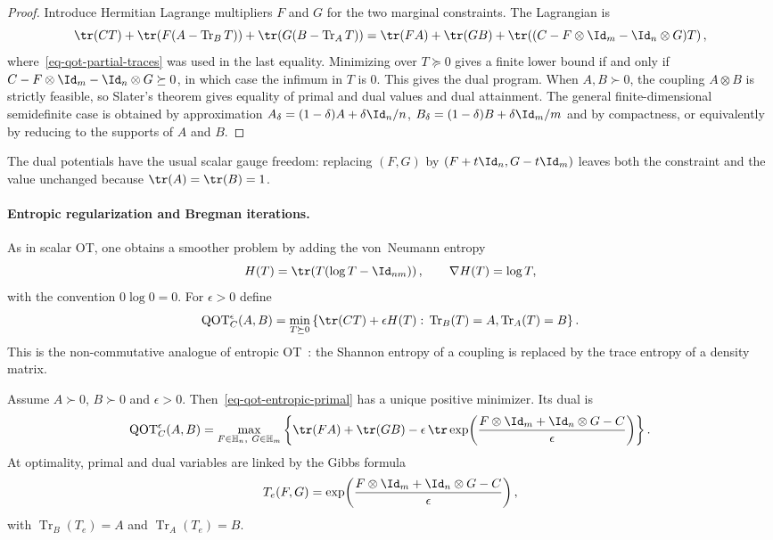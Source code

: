\begin{proof}
	Introduce Hermitian Lagrange multipliers $F$ and $G$ for the two marginal constraints. The Lagrangian is
	\[
		\tr(CT)+\tr\!\left(F(A-\operatorname{Tr}_B T)\right)
		+\tr\!\left(G(B-\operatorname{Tr}_A T)\right)
		=
		\tr(FA)+\tr(GB)
		+\tr\!\left((C-F\otimes\Id_m-\Id_n\otimes G)T\right),
	\]
	where~\eqref{eq-qot-partial-traces} was used in the last equality. Minimizing over $T\succeq0$ gives a finite lower bound if and only if $C-F\otimes\Id_m-\Id_n\otimes G\succeq0$, in which case the infimum in $T$ is $0$. This gives the dual program. When $A,B\succ0$, the coupling $A\otimes B$ is strictly feasible, so Slater's theorem gives equality of primal and dual values and dual attainment. The general finite-dimensional semidefinite case is obtained by approximation $A_\delta=(1-\delta)A+\delta\Id_n/n$, $B_\delta=(1-\delta)B+\delta\Id_m/m$ and by compactness, or equivalently by reducing to the supports of $A$ and $B$.
\end{proof}

The dual potentials have the usual scalar gauge freedom: replacing $(F,G)$ by $(F+t\Id_n,G-t\Id_m)$ leaves both the constraint and the value unchanged because $\tr(A)=\tr(B)=1$.

\paragraph{Entropic regularization and Bregman iterations.}
As in scalar OT, one obtains a smoother problem by adding the von~Neumann entropy
\[
	H(T)=\tr\!\left(T(\log T-\Id_{nm})\right),
	\qquad
	\nabla H(T)=\log T,
\]
with the convention $0\log0=0$. For $\epsilon>0$ define
\begin{equation}\label{eq-qot-entropic-primal}
	\mathrm{QOT}_C^\epsilon(A,B)
	=
	\min_{T\succeq0}
	\left\{
		\tr(CT)+\epsilon H(T)
		:\,
		\operatorname{Tr}_B(T)=A,
		\operatorname{Tr}_A(T)=B
	\right\}.
\end{equation}
This is the non-commutative analogue of entropic OT~\cite{2016-peyre-qot,chakrabarti2019quantum}: the Shannon entropy of a coupling is replaced by the trace entropy of a density matrix.

\begin{prop}\label{prop-qot-entropic-duality}
	Assume $A\succ0$, $B\succ0$ and $\epsilon>0$. Then~\eqref{eq-qot-entropic-primal} has a unique positive minimizer. Its dual is
	\begin{equation}\label{eq-qot-entropic-dual}
		\mathrm{QOT}_C^\epsilon(A,B)
		=
		\max_{F\in\mathbb H_n,\ G\in\mathbb H_m}
		\left\{
			\tr(FA)+\tr(GB)
			-\epsilon\,
			\tr\exp\!\left(\frac{F\otimes\Id_m+\Id_n\otimes G-C}{\epsilon}\right)
		\right\}.
	\end{equation}
	At optimality, primal and dual variables are linked by the Gibbs formula
	\begin{equation}\label{eq-qot-gibbs-coupling}
		T_e(F,G)
		=
		\exp\!\left(\frac{F\otimes\Id_m+\Id_n\otimes G-C}{\epsilon}\right),
	\end{equation}
	with $\operatorname{Tr}_B(T_e)=A$ and $\operatorname{Tr}_A(T_e)=B$.
\end{prop}

